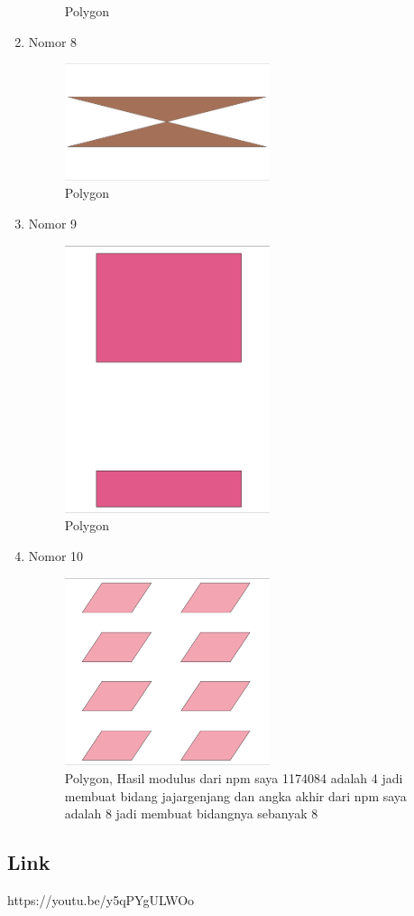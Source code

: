 \begin{enumerate}
\begin{figure}[H]
		\centering
		\caption{Polygon}
	\end{figure}
	\item Nomor 8
	
	\begin{figure}[H]
		\includegraphics[width=6cm]{figures/Tugas2/1174084/no8.png}
		\centering
		\caption{Polygon}
	\end{figure}
	\item Nomor 9
	
	\begin{figure}[H]
		\includegraphics[width=6cm]{figures/Tugas2/1174084/no9.png}
		\centering
		\caption{Polygon}
	\end{figure}
	\item Nomor 10
	
	\begin{figure}[H]
		\includegraphics[width=6cm]{figures/Tugas2/1174084/no10.png}
		\centering
		\caption{Polygon, Hasil modulus dari npm saya 1174084 adalah 4 jadi membuat bidang jajargenjang dan angka akhir dari npm saya adalah 8 jadi membuat bidangnya sebanyak 8}
	\end{figure}
\end{enumerate}
\subsection{Link}
https://youtu.be/y5qPYgULWOo
